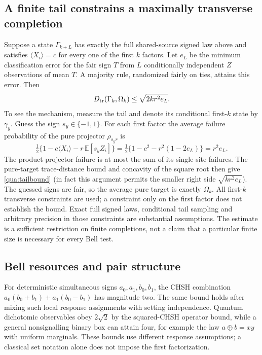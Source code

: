 \subsection{A finite tail constrains a maximally transverse completion}
\label{qua:tail}
Suppose a state $\Gamma_{k+L}$ has exactly the full shared-source signed law above and satisfies $\langle X_i\rangle=c$ for every one of the first $k$ factors. Let $e_L$ be the minimum classification error for the fair sign $T$ from $L$ conditionally independent $Z$ observations of mean $T$. A majority rule, randomized fairly on ties, attains this error. Then
\begin{equation}
 D_{\rm tr}(\Gamma_k,\Omega_k)\le\sqrt{2kr^2e_L}.
 \label{qua:tailbound}
\end{equation}
To see the mechanism, measure the tail and denote its conditional first-$k$ state by $\gamma_y$. Guess the sign $s_y\in\{-1,1\}$. For each first factor the average failure probability of the pure projector $\rho_{s_yr}$ is
\[
 \tfrac12\{1-c\langle X_i\rangle-r\,\mathbb E[s_yZ_i]\}
 =\tfrac12\{1-c^2-r^2(1-2e_L)\}=r^2e_L.
\]
The product-projector failure is at most the sum of its single-site failures. The pure-target trace-distance bound and concavity of the square root then give \eqref{qua:tailbound} (in fact this argument permits the smaller right side $\sqrt{kr^2e_L}$). The guessed signs are fair, so the average pure target is exactly $\Omega_k$. All first-$k$ transverse constraints are used; a constraint only on the first factor does not establish the bound. Exact full signed laws, conditional tail sampling and arbitrary precision in those constraints are substantial assumptions. The estimate is a sufficient restriction on finite completions, not a claim that a particular finite size is necessary for every Bell test.

\subsection{Bell resources and pair structure}
\label{qua:bell}
For deterministic simultaneous signs $a_0,a_1,b_0,b_1$, the CHSH combination
$a_0(b_0+b_1)+a_1(b_0-b_1)$ has magnitude two. The same bound holds after mixing such local response assignments with setting independence. Quantum dichotomic observables obey $2\sqrt2$ by the squared-CHSH operator bound, while a general nonsignalling binary box can attain four, for example the law $a\oplus b=xy$ with uniform marginals. These bounds use different response assumptions; a classical set notation alone does not impose the first factorization.


